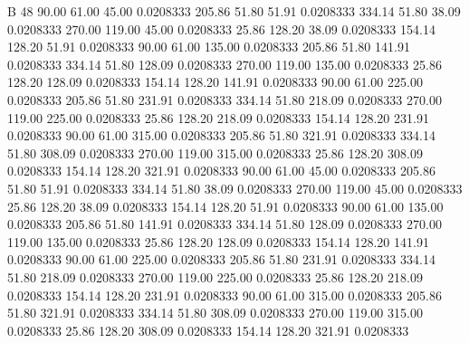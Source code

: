 


B 48
  90.00   61.00   45.00   0.0208333
 205.86   51.80   51.91   0.0208333
 334.14   51.80   38.09   0.0208333
 270.00  119.00   45.00   0.0208333
  25.86  128.20   38.09   0.0208333
 154.14  128.20   51.91   0.0208333
  90.00   61.00  135.00   0.0208333
 205.86   51.80  141.91   0.0208333
 334.14   51.80  128.09   0.0208333
 270.00  119.00  135.00   0.0208333
  25.86  128.20  128.09   0.0208333
 154.14  128.20  141.91   0.0208333
  90.00   61.00  225.00   0.0208333
 205.86   51.80  231.91   0.0208333
 334.14   51.80  218.09   0.0208333
 270.00  119.00  225.00   0.0208333
  25.86  128.20  218.09   0.0208333
 154.14  128.20  231.91   0.0208333
  90.00   61.00  315.00   0.0208333
 205.86   51.80  321.91   0.0208333
 334.14   51.80  308.09   0.0208333
 270.00  119.00  315.00   0.0208333
  25.86  128.20  308.09   0.0208333
 154.14  128.20  321.91   0.0208333
  90.00   61.00   45.00   0.0208333
 205.86   51.80   51.91   0.0208333
 334.14   51.80   38.09   0.0208333
 270.00  119.00   45.00   0.0208333
  25.86  128.20   38.09   0.0208333
 154.14  128.20   51.91   0.0208333
  90.00   61.00  135.00   0.0208333
 205.86   51.80  141.91   0.0208333
 334.14   51.80  128.09   0.0208333
 270.00  119.00  135.00   0.0208333
  25.86  128.20  128.09   0.0208333
 154.14  128.20  141.91   0.0208333
  90.00   61.00  225.00   0.0208333
 205.86   51.80  231.91   0.0208333
 334.14   51.80  218.09   0.0208333
 270.00  119.00  225.00   0.0208333
  25.86  128.20  218.09   0.0208333
 154.14  128.20  231.91   0.0208333
  90.00   61.00  315.00   0.0208333
 205.86   51.80  321.91   0.0208333
 334.14   51.80  308.09   0.0208333
 270.00  119.00  315.00   0.0208333
  25.86  128.20  308.09   0.0208333
 154.14  128.20  321.91   0.0208333
